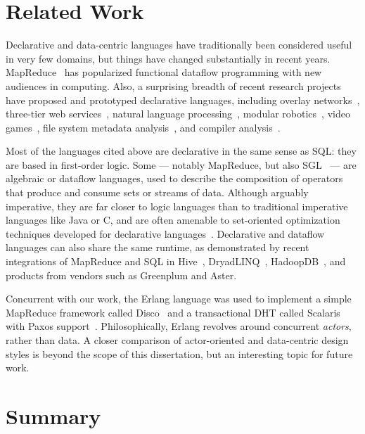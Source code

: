 \section{Related Work}
\label{ch:boom:sec:relwork}

Declarative and data-centric languages have traditionally been considered useful
in very few domains, but things have changed substantially in recent years.
MapReduce~\cite{mapreduce-osdi} has popularized functional dataflow programming
with new audiences in computing.  Also, a surprising breadth of recent research
projects have proposed and prototyped declarative languages, including overlay
networks~\cite{p2:sosp}, three-tier web services~\cite{hilda}, natural language
processing~\cite{dyna}, modular robotics~\cite{meld}, video games~\cite{cornellgames}, 
file system metadata analysis~\cite{wiscfsck}, and compiler analysis~\cite{bddbddb}.

Most of the languages cited above are declarative in the same sense as SQL: they are 
based in first-order logic. Some --- notably MapReduce, but also SGL~\cite{cornellgames} --- are
algebraic or dataflow languages, used to describe the composition of operators that produce and 
consume sets or streams of data.  Although arguably imperative, they are far closer to logic languages 
than to traditional imperative languages like Java or C, and are often amenable to set-oriented optimization 
techniques developed for declarative languages~\cite{cornellgames}. Declarative and dataflow languages 
can also share the same runtime, as demonstrated by recent integrations of MapReduce and SQL
in Hive~\cite{hive-vldb}, DryadLINQ~\cite{DryadLINQ}, HadoopDB~\cite{hadoopdb}, and products from vendors 
such as Greenplum and Aster.

Concurrent with our work, the Erlang language was used to implement a simple MapReduce framework called 
Disco~\cite{disco} and a transactional DHT called Scalaris with Paxos support~\cite{scalaris}. Philosophically, Erlang 
revolves around concurrent {\em actors}, rather than data. A closer comparison of actor-oriented and data-centric design 
styles is beyond the scope of this dissertation, but an interesting topic for future work.

\section{Summary}
\label{ch:boom:sec:conclusion}


